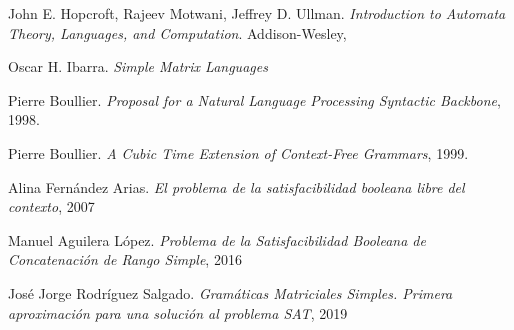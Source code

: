 \documentclass{article}
\begin{document}
\begin{thebibliography}{9}

      John E. Hopcroft, Rajeev Motwani, Jeffrey D. Ullman.
      \textit{Introduction to Automata Theory, Languages, and Computation}.
      Addison-Wesley,

      Oscar H. Ibarra.
      \textit{Simple Matrix Languages}

      Pierre Boullier.
      \textit{Proposal for a Natural Language Processing Syntactic Backbone},
      1998.

      Pierre Boullier.
      \textit{A Cubic Time Extension of Context-Free Grammars},
      1999.

      Alina Fernández Arias.
      \textit{El problema de la satisfacibilidad booleana libre del contexto},
      2007

      Manuel Aguilera López.
      \textit{Problema de la Satisfacibilidad Booleana de Concatenación de Rango Simple},
      2016

      José Jorge Rodríguez Salgado.
      \textit{Gramáticas Matriciales Simples. Primera aproximación para una solución al problema SAT},
      2019

\end{thebibliography}
\end{document}
